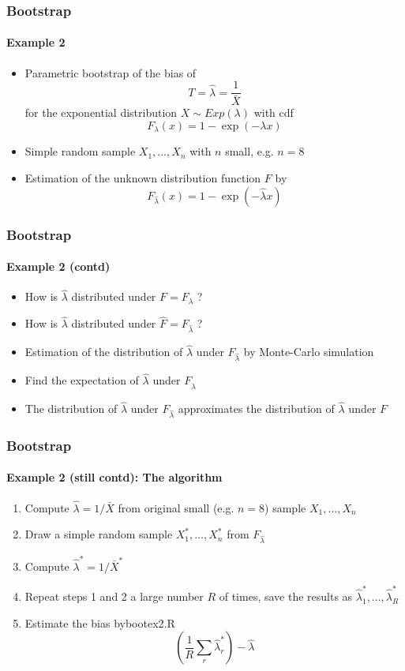 \documentclass[smaller,compress]{beamer}
\begin{document}
\begin{frame}\frametitle{Bootstrap}\framesubtitle{Example 2}
\begin{itemize}
    \item Parametric bootstrap of the bias of
    \begin{equation*}
    T=\hat{\lambda}=\frac{1}{\bar{X}}
    \end{equation*}
    for the exponential distribution $X\sim Exp(\lambda )$ with cdf
    \begin{equation*}
    F_{\lambda}(x)=1-\exp \left( -\lambda x\right)
    \end{equation*}
    \item Simple random sample $X_{1},\ldots ,X_{n}$ with $n$ small, e.g. $n=8$
    \item Estimation of the unknown distribution function $F$ by
    \begin{equation*}
    F_{\hat{\lambda}}(x)=1-\exp \left( -\hat{\lambda}x\right)
    \end{equation*}
\end{itemize}
\end{frame}


\begin{frame}\frametitle{Bootstrap}\framesubtitle{Example 2 (contd)}
\begin{itemize}
    \item How is $\hat{\lambda}$ distributed under $F=F_\lambda$ ?
    \item How is $\hat{\lambda}$ distributed under $\hat{F}=F_{\hat{\lambda}}$ ?
    \item Estimation of the distribution of $\hat{\lambda}$ under $F_{\hat{\lambda}}$ by Monte-Carlo simulation
    \item Find the expectation of $\hat{\lambda}$ under $F_{\hat{\lambda}}$
    \item The distribution of $\hat{\lambda}$ under $F_{\hat{\lambda}}$ approximates the distribution of $\hat{\lambda}$ under $F$
\end{itemize}
\end{frame}


\begin{frame}\frametitle{Bootstrap}\framesubtitle{Example 2 (still contd): The algorithm}
\begin{enumerate}
    \item Compute $\hat{\lambda}=1/\bar{X}$ from original small (e.g. $n=8$) sample $X_{1},\ldots ,X_{n}$
    \item Draw a simple random sample $X_{1}^{\ast },\ldots ,X_{n}^{\ast }$ from $F_{\hat{\lambda}}$
    \item Compute $\hat{\lambda}^{\ast }=1/\bar{X}^{\ast }$
    \item Repeat steps 1 and 2 a large number $R$ of times, save the results as $\hat{\lambda}_{1}^{\ast },\ldots ,\hat{\lambda}_{R}^{\ast }$
    \item Estimate the bias by\hfill {\tiny bootex2.R}
    \begin{equation*}
    \left( \frac{1}{R}\sum_{r}\hat{\lambda}_{r}^{\ast }\right) -\hat{\lambda}
    \end{equation*}
\end{enumerate}
\end{frame}
\end{document}
